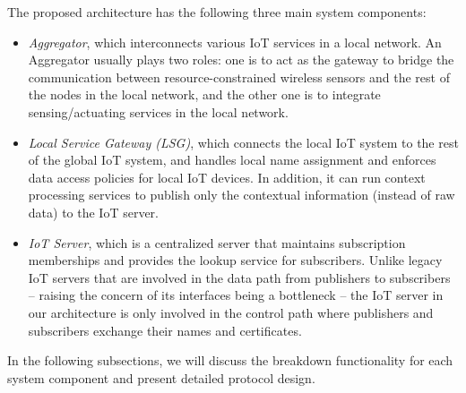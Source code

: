 The proposed architecture has the following three main system components:
\begin{itemize}
\item{\em Aggregator}, which interconnects various IoT services in a local network. An Aggregator usually plays two roles: one is to act as the gateway to bridge the communication between resource-constrained wireless sensors and the rest of the nodes in the local network,  and the other one is to integrate sensing/actuating services in the local network.


\item{\em Local Service Gateway (LSG)}, which connects the local IoT system to the rest of the global IoT system, and handles local name assignment and enforces  data access policies for local IoT devices. In addition, it can run context processing services to publish only the contextual information (instead of raw data) to the IoT server.

\item{\em IoT Server}, which is a centralized server that maintains subscription memberships and provides the lookup service for subscribers. Unlike legacy IoT servers that are involved in the data path from publishers to subscribers -- raising the concern of its interfaces being a bottleneck -- the IoT server in our architecture is only involved in the control path where publishers and subscribers exchange their names and certificates.

\end{itemize}

In the following subsections, we will discuss the breakdown functionality for each system component and present detailed protocol design.

